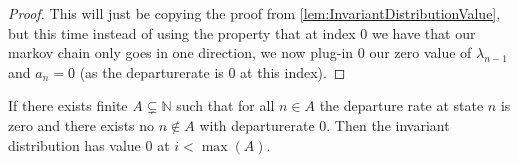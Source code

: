 \begin{proof}
  This will just be copying the proof from \ref{lem:InvariantDistributionValue}, but this time instead
  of using the property that at index $0$ we have that our markov chain only goes in one direction,
  we now plug-in $0$ our zero value of $\lambda_{n-1}$ and $a_n = 0$ (as the departurerate is $0$ at this index).
\end{proof}

\begin{lemma}\label{lem:MaxUnreachableInvariance}
  If there exists finite $A \subsetneq \mathbb{N}$ such that for all $n \in A$ the departure rate at
  state $n$ is zero and there exists no $n \notin A$ with departurerate $0$.
  Then the invariant distribution has value $0$ at $i < \max(A)$.
\end{lemma}
